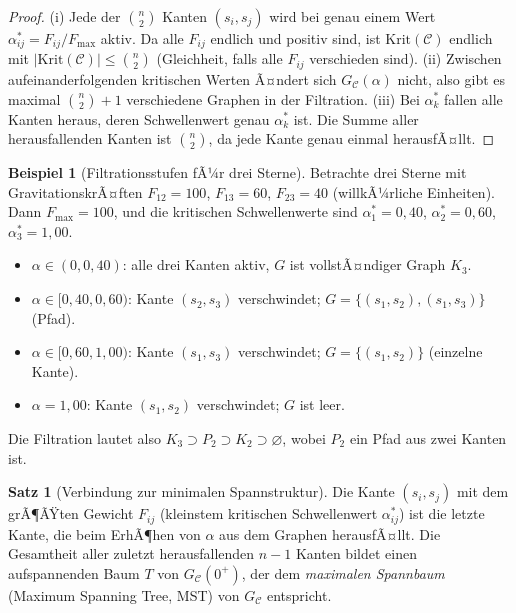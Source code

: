 ﻿\documentclass[a4paper,12pt]{report}
\theoremstyle{definition}
\newtheorem{beispiel}{Beispiel}
\newtheorem{satz}{Satz}
\begin{document}
\begin{proof}
(i) Jede der $\binom{n}{2}$ Kanten $(s_i, s_j)$ wird bei genau einem Wert $\alpha^*_{ij} = F_{ij}/F_\mathrm{max}$ aktiv. Da alle $F_{ij}$ endlich und positiv sind, ist $\mathrm{Krit}(\mathcal{C})$ endlich mit $|\mathrm{Krit}(\mathcal{C})| \leq \binom{n}{2}$ (Gleichheit, falls alle $F_{ij}$ verschieden sind). (ii) Zwischen aufeinanderfolgenden kritischen Werten Ã¤ndert sich $G_\mathcal{C}(\alpha)$ nicht, also gibt es maximal $\binom{n}{2}+1$ verschiedene Graphen in der Filtration. (iii) Bei $\alpha^*_k$ fallen alle Kanten heraus, deren Schwellenwert genau $\alpha^*_k$ ist. Die Summe aller herausfallenden Kanten ist $\binom{n}{2}$, da jede Kante genau einmal herausfÃ¤llt.
\end{proof}

\begin{beispiel}[Filtrationsstufen fÃ¼r drei Sterne]
\label{bsp:filtration_drei}
Betrachte drei Sterne mit GravitationskrÃ¤ften $F_{12} = 100$, $F_{13} = 60$, $F_{23} = 40$ (willkÃ¼rliche Einheiten). Dann $F_\mathrm{max} = 100$, und die kritischen Schwellenwerte sind $\alpha^*_1 = 0{,}40$, $\alpha^*_2 = 0{,}60$, $\alpha^*_3 = 1{,}00$.

\begin{itemize}
    \item $\alpha \in (0, 0{,}40)$: alle drei Kanten aktiv, $G$ ist vollstÃ¤ndiger Graph $K_3$.
    \item $\alpha \in [0{,}40, 0{,}60)$: Kante $(s_2, s_3)$ verschwindet; $G = \{(s_1,s_2), (s_1,s_3)\}$ (Pfad).
    \item $\alpha \in [0{,}60, 1{,}00)$: Kante $(s_1, s_3)$ verschwindet; $G = \{(s_1, s_2)\}$ (einzelne Kante).
    \item $\alpha = 1{,}00$: Kante $(s_1, s_2)$ verschwindet; $G$ ist leer.
\end{itemize}

Die Filtration lautet also $K_3 \supset P_2 \supset K_2 \supset \varnothing$, wobei $P_2$ ein Pfad aus zwei Kanten ist.
\end{beispiel}

\begin{satz}[Verbindung zur minimalen Spannstruktur]
\label{satz:mst}
Die Kante $(s_i, s_j)$ mit dem grÃ¶ÃŸten Gewicht $F_{ij}$ (kleinstem kritischen Schwellenwert $\alpha^*_{ij}$) ist die letzte Kante, die beim ErhÃ¶hen von $\alpha$ aus dem Graphen herausfÃ¤llt. Die Gesamtheit aller zuletzt herausfallenden $n-1$ Kanten bildet einen aufspannenden Baum $T$ von $G_\mathcal{C}(0^+)$, der dem \emph{maximalen Spannbaum} (Maximum Spanning Tree, MST) von $G_\mathcal{C}$ entspricht.
\end{satz}
\end{document}
